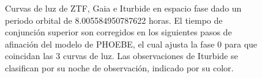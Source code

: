 \begin{figure}[!h]
	\caption{Curvas de luz de ZTF, Gaia e Iturbide en espacio fase dado un
		periodo orbital de 8.005584950787622 horas. El tiempo de conjunción
		superior son corregidos en los siguientes pasos de afinación del modelo
		de PHOEBE, el cual ajusta la fase 0 para que coincidan las 3 curvas de
		luz. Las observaciones de Iturbide se clasifican por su noche de
		observación, indicado por su color.}
	\label{figuraGaiaIturbideZtfCurvasFase}
\end{figure}